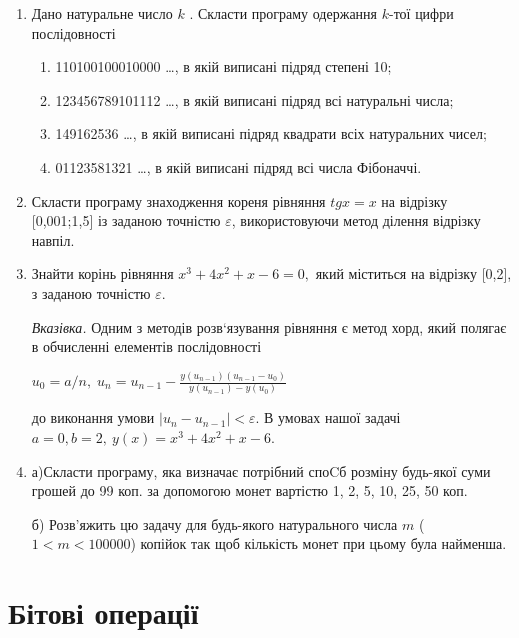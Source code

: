 \documentclass[a5paper,titlepage,openany,twoside,draft]{book_unv}%
\makeatletter
\newcommand{\xslalph}[1]{\expandafter\@xslalph\csname c@#1\endcsname}
\newcommand{\@xslalph}[1]{%
    \ifcase#1\or а\or б\or в\or г\or д\or e\or є\or ж\or з\or i%
    \or й\or к\or л\or м\or н\or о\or п\or р\or с\or т%
    \or у\or ф\or х\or ц\or ч\or ш\or ю\or я\or аа\or бб\or вв%
    \else\@ctrerr\fi%
}
\makeatother
\begin{document}
\begin{enumerate}
\def\labelenumi{\arabic{enumi})}
\setcounter{enumi}{16}
\item
  Дано натуральне число $k$ . Скласти програму одержання $k$-тої цифри послідовності
\begin{enumerate}[label=\xslalph*)]
\item 110100100010000 \ldots, в якій виписані підряд степені 10;
\item 123456789101112 \ldots , в якій виписані підряд всі натуральні числа;
\item 149162536 \ldots , в якій виписані підряд квадрати всіх натуральних
чисел;
\item 01123581321 \ldots , в якій виписані підряд всі числа Фібоначчі.

\end{enumerate}

\item
  Скласти програму знаходження кореня рівняння \(tgx = x\) на відрізку
  {[}0,001;1,5{]} із заданою точністю \(\varepsilon\), використовуючи
  метод ділення відрізку навпіл.
\item
  Знайти корінь рівняння \(x^{3} + 4x^{2} + x - 6 = 0,\) який міститься
  на відрізку {[}0,2{]}, з заданою точністю \(\varepsilon\).

\emph{\emph{Вказівка.}} Одним з методів розв`язування рівняння є метод
хорд, який полягає в обчисленні елементів послідовності 

\(u_{0} = a / n, \;  u_{n} = u_{n-1} - \frac{y(u_{n-1}) (u_{n-1} -u_{0})}{y(u_{n-1}) -y(u_{0})} \) 

до виконання умови \(\left| u_{n} - u_{n - 1} \right| < \varepsilon\). В
умовах нашої задачі \(a = 0,b = 2,\ y(x) = x^{3} + 4x^{2} + x - 6.\)

\item
  а)Скласти програму, яка визначає потрібний споCб розміну будь-якої
  суми грошей до 99 коп. за допомогою монет вартістю 1, 2, 5, 10, 25, 50
  коп.

  б) Розв'яжить цю задачу для будь-якого натурального числа $m$
($1 <m<100000$) копійок так щоб кількість монет при
цьому була найменша.
\end{enumerate}

\chapter{Бітові операції }
%
\end{document}
